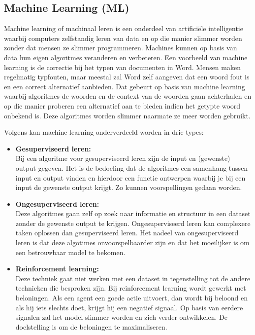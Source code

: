 \subsection{Machine Learning (ML)}
\label{subsec:begrippen-ml}


Machine learning of machinaal leren is een onderdeel van artificiële intelligentie waarbij computers zelfstandig leren van data en op die manier slimmer worden zonder dat mensen ze slimmer programmeren. Machines kunnen op basis van data hun eigen algoritmes veranderen en verbeteren. Een voorbeeld van machine learning is de correctie bij het typen van documenten in Word. Mensen maken regelmatig typfouten, maar meestal zal Word zelf aangeven dat een woord fout is en een correct alternatief aanbieden. Dat gebeurt op basis van machine learning waarbij algoritmes de woorden en de context van de woorden gaan achterhalen en op die manier proberen een alternatief aan te bieden indien het getypte woord onbekend is. Deze algoritmes worden slimmer naarmate ze meer worden gebruikt.


Volgens \textcite{Lievens2019} kan machine learning onderverdeeld worden in drie types:

\begin{itemize}
    \item \textbf{Gesuperviseerd leren:} \\
    
    Bij een algoritme voor gesuperviseerd leren zijn de input en (gewenste) output gegeven. Het is de bedoeling dat de algoritmes een samenhang tussen input en output vinden en hierdoor een functie ontwerpen waarbij je bij een input de gewenste output krijgt. Zo kunnen voorspellingen gedaan worden. \\
    
    \item \textbf{Ongesuperviseerd leren:} \\
    
    Deze algoritmes gaan zelf op zoek naar informatie en structuur in een dataset zonder de gewenste output te krijgen. Ongesuperviseerd leren kan complexere taken oplossen dan gesuperviseerd leren. Het nadeel van ongesuperviseerd leren is dat deze algotimes onvoorspelbaarder zijn en dat het moeilijker is om een betrouwbaar model te bekomen. \\
    
    \item \textbf{Reinforcement learning:} \\
    
    Deze techniek gaat niet werken met een dataset in tegenstelling tot de andere technieken die besproken zijn. Bij reinforcement learning wordt gewerkt met beloningen. Als een agent een goede actie uitvoert, dan wordt bij beloond en als hij iets slechts doet, krijgt hij een negatief signaal. Op basis van eerdere signalen zal het model slimmer worden en zich verder ontwikkelen. De doelstelling is om de beloningen te maximaliseren. \\
\end{itemize}


